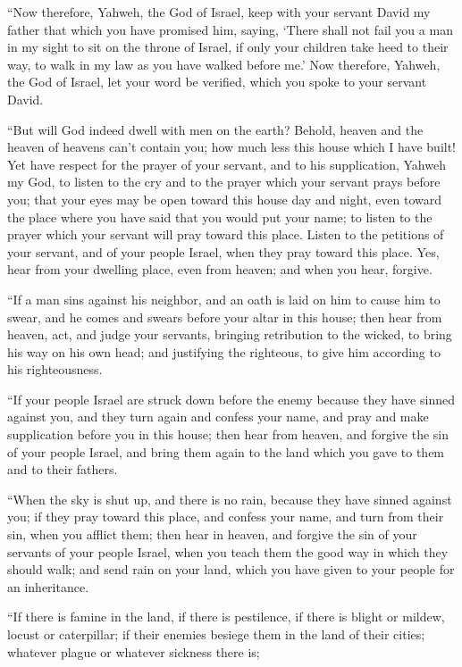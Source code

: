 {\par }{\PP {}“Now therefore, Yahweh, the God of Israel, keep with your servant David my father that which you have promised him, saying, ‘There shall not fail you a man in my sight to sit on the throne of Israel, if only your children take heed to their way, to walk in my law as you have walked before me.’
Now therefore, Yahweh, the God of Israel, let your word be verified, which you spoke to your servant David.
\par }{\PP {}“But will God indeed dwell with men on the earth? Behold, heaven and the heaven of heavens can’t contain you; how much less this house which I have built!
Yet have respect for the prayer of your servant, and to his supplication, Yahweh my God, to listen to the cry and to the prayer which your servant prays before you;
that your eyes may be open toward this house day and night, even toward the place where you have said that you would put your name; to listen to the prayer which your servant will pray toward this place.
Listen to the petitions of your servant, and of your people Israel, when they pray toward this place. Yes, hear from your dwelling place, even from heaven; and when you hear, forgive.
\par }{\PP {}“If a man sins against his neighbor, and an oath is laid on him to cause him to swear, and he comes and swears before your altar in this house;
then hear from heaven, act, and judge your servants, bringing retribution to the wicked, to bring his way on his own head; and justifying the righteous, to give him according to his righteousness.
\par }{\PP {}“If your people Israel are struck down before the enemy because they have sinned against you, and they turn again and confess your name, and pray and make supplication before you in this house;
then hear from heaven, and forgive the sin of your people Israel, and bring them again to the land which you gave to them and to their fathers.
\par }{\PP {}“When the sky is shut up, and there is no rain, because they have sinned against you; if they pray toward this place, and confess your name, and turn from their sin, when you afflict them;
then hear in heaven, and forgive the sin of your servants of your people Israel, when you teach them the good way in which they should walk; and send rain on your land, which you have given to your people for an inheritance.
\par }{\PP {}“If there is famine in the land, if there is pestilence, if there is blight or mildew, locust or caterpillar; if their enemies besiege them in the land of their cities; whatever plague or whatever sickness there is;
}
